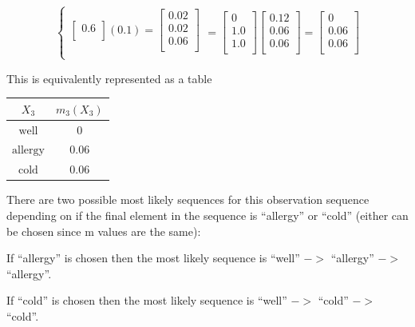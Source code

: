 \documentclass[12pt]{article}
\begin{document}
\begin{enumerate}
\[\begin{cases}
\begin{bmatrix}
        0.6 \\
      \end{bmatrix} (0.1) =
      \begin{bmatrix}
        0.02 \\
        0.02 \\
        0.06 \\
      \end{bmatrix}
      \\
    \end{cases}
    =
    \begin{bmatrix}
      0 \\
      1.0 \\
      1.0 \\
    \end{bmatrix}
    \begin{bmatrix}
      0.12 \\
      0.06 \\
      0.06 \\
    \end{bmatrix}
    =
    \begin{bmatrix}
      0 \\
      0.06 \\
      0.06 \\
    \end{bmatrix}
  \]

  This is equivalently represented as a table

  \begin{center}
    \begin{tabular}{|c|c|}
      \hline
      $X_3$ & $m_3(X_3)$ \\
      \hline
      $\text{well}$ & 0 \\
      \hline
      $\text{allergy}$ & 0.06 \\
      \hline
      $\text{cold}$ & 0.06 \\
      \hline
    \end{tabular}
  \end{center}

  There are two possible most likely sequences for this observation sequence depending on if the final element in the sequence is ``allergy'' or ``cold'' (either can be chosen since m values are the same):

  If ``allergy'' is chosen then the most likely sequence is ``well'' $->$ ``allergy'' $->$ ``allergy''.

  If ``cold'' is chosen then the most likely sequence is ``well'' $->$ ``cold'' $->$ ``cold''.

\end{enumerate}
\end{document}
